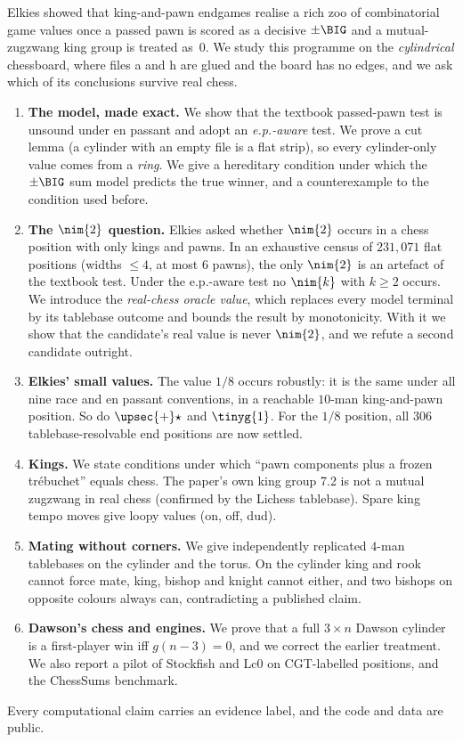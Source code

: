 Elkies showed that king-and-pawn endgames realise a rich zoo of combinatorial game values once a
passed pawn is scored as a decisive $\pm\BIG$ and a mutual-zugzwang king group is treated as~$0$.
We study this programme on the \emph{cylindrical} chessboard, where files a and h are glued and the board has
no edges, and we ask which of its conclusions survive real chess.
\begin{enumerate}[label=(\roman*),leftmargin=*]
\item \textbf{The model, made exact.} We show that the textbook passed-pawn test is unsound under en passant
  and adopt an \emph{e.p.-aware} test. We prove a cut lemma (a cylinder with an empty file is a flat strip),
  so every cylinder-only value comes from a \emph{ring}. We give a hereditary condition under which the
  $\pm\BIG$ sum model predicts the true winner, and a counterexample to the condition used before.
\item \textbf{The $\nim{2}$ question.} Elkies asked whether $\nim{2}$ occurs in a chess position with only
  kings and pawns. In an exhaustive census of $231{,}071$ flat positions (widths $\le 4$, at most $6$ pawns),
  the only $\nim{2}$ is an artefact of the textbook test. Under the e.p.-aware test no $\nim{k}$ with
  $k\ge2$ occurs. We introduce the \emph{real-chess oracle value}, which replaces every model terminal by its
  tablebase outcome and bounds the result by monotonicity. With it we show that the candidate's real value is
  never $\nim{2}$, and we refute a second candidate outright.
\item \textbf{Elkies' small values.} The value $1/8$ occurs robustly: it is the same under all nine race and
  en passant conventions, in a reachable $10$-man king-and-pawn position. So do $\upsec{+}\star$ and
  $\tinyg{1}$. For the $1/8$ position, all $306$ tablebase-resolvable end positions are now settled.
\item \textbf{Kings.} We state conditions under which ``pawn components plus a frozen tr\'ebuchet'' equals
  chess. The paper's own king group 7.2 is not a mutual zugzwang in real chess (confirmed by the Lichess
  tablebase). Spare king tempo moves give loopy values (\textsf{on}, \textsf{off}, \textsf{dud}).
\item \textbf{Mating without corners.} We give independently replicated $4$-man tablebases on the cylinder and
  the torus. On the cylinder king and rook cannot force mate, king, bishop and knight cannot either, and two
  bishops on opposite colours always can, contradicting a published claim.
\item \textbf{Dawson's chess and engines.} We prove that a full $3\times n$ Dawson cylinder is a first-player
  win iff $g(n-3)=0$, and we correct the earlier treatment. We also report a pilot of Stockfish and Lc0 on
  CGT-labelled positions, and the ChessSums benchmark.
\end{enumerate}
Every computational claim carries an evidence label, and the code and data are public.
